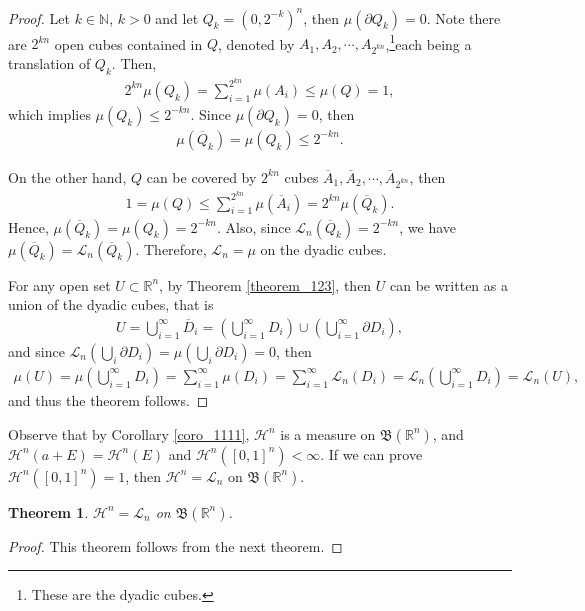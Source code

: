\documentclass[11pt]{book}
\newtheorem{theorem}{Theorem}[chapter]
\theoremstyle{definition}
\numberwithin{equation}{chapter}
\def\BB{\mathfrak{B}}
\def\H{{\mathcal H}}
\def\L{{\mathcal L}}
\begin{document}
\begin{proof}
Let $k \in \mathbb{N}$, $k > 0$ and let $Q_k = (0,2^{-k})^n$, then $\mu(\partial Q_k) = 0$. Note there are $2^{kn}$ open cubes contained in $Q$, denoted by $A_1, A_2, \cdots, A_{2^{kn}}$,\footnote{These are the dyadic cubes.}each being a translation of $Q_k$. Then, 
\begin{align*}
    2^{kn} \mu(Q_k) = \sum^{2^{kn}}_{i=1} \mu(A_i) \leq \mu(Q) = 1,
\end{align*}
which implies $\mu(Q_k) \leq 2^{-kn}$. Since $\mu(\partial Q_k) = 0$, then 
\begin{align*}
    \mu(\overline{Q}_k) = \mu(Q_k) \leq 2^{-kn}.
\end{align*}

On the other hand, $Q$ can be covered by $2^{kn}$ cubes $\overline{A}_1, \overline{A}_2, \cdots, \overline{A}_{2^{kn}}$, then
\begin{align*}
    1 = \mu(Q) \leq \sum^{2^{kn}}_{i=1} \mu(\overline{A}_i) = 2^{kn} \mu(\overline{Q}_k).
\end{align*}
Hence, $\mu(\overline{Q}_k) = \mu(Q_k) = 2^{-kn}$. Also, since $\L_n(\overline{Q}_k) = 2^{-kn}$, we have $\mu(\overline{Q}_k) = \L_n(\overline{Q}_k)$. Therefore, $\L_n = \mu$ on the dyadic cubes. 

For any open set $U \subset \mathbb{R}^n$, by Theorem \ref{theorem_123}, then $U$ can be written as a union of the dyadic cubes, that is 
\begin{align*}
    U = \bigcup^\infty_{i=1} \overline{D}_i = \left(\bigcup^\infty_{i=1} D_i\right) \cup \left(\bigcup^\infty_{i=1} \partial D_i\right),
\end{align*}
and since $\L_n(\bigcup_i \partial D_i) = \mu(\bigcup_i \partial D_i) = 0$, then 
\begin{align*}
    \mu(U) = \mu\left(\bigcup^\infty_{i=1} D_i\right) = \sum^\infty_{i=1} \mu(D_i) = \sum^\infty_{i=1} \L_n(D_i) = \L_n\left(\bigcup^\infty_{i=1} D_i\right) = \L_n(U),
\end{align*}
and thus the theorem follows.
\end{proof}

\medskip

Observe that by Corollary \ref{coro_1111}, $\H^n$ is a measure on $\BB(\mathbb{R}^n)$, and $\H^n(a+E) = \H^n(E)$ and $\H^n([0,1]^n) < \infty$. If we can prove $\H^n([0,1]^n) = 1$, then $\H^n = \L_n$ on $\BB(\mathbb{R}^n)$.

\medskip

\begin{theorem}
$\H^n = \L_n$ on $\BB(\mathbb{R}^n)$.
\end{theorem}
\begin{proof}
This theorem follows from the next theorem.
\end{proof}
\end{document}
